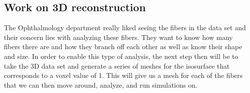\documentclass[11pt,psfig]{article}
\begin{document}
\subsection{Work on 3D reconstruction}

The Ophthalmology department really liked seeing the fibers in the data set and their concern lies with analyzing these fibers. They want to know how many fibers there are and how they branch off each other as well as know their shape and size. In order to enable this type of analysis, the next step then will be to take the 3D data set and generate a series of meshes for the isosurface that corresponds to a voxel value of 1. This will give us a mesh for each of the fibers that we can then move around, analyze, and run simulations on.  
\end{document}
